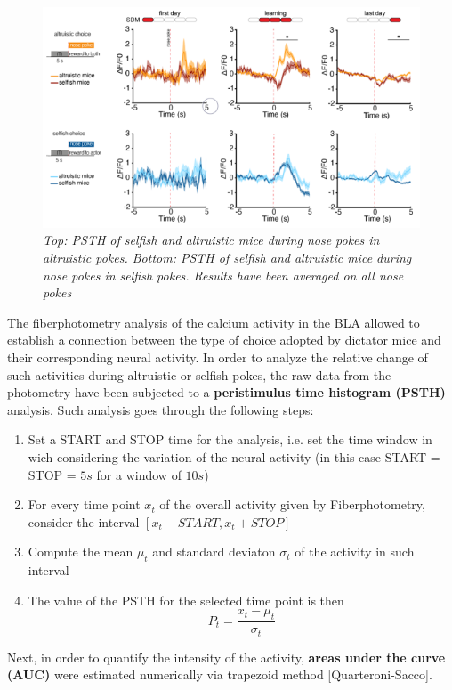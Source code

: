 \documentclass[a4paper]{article}
\begin{document}
\begin{figure}[H]
	\begin{center}
		\includegraphics[scale=0.77]{psth.png} 
	\end{center} 
	\caption{\textit{Top: PSTH of selfish and altruistic mice during nose pokes in altruistic pokes. Bottom:  PSTH of selfish and altruistic mice during nose pokes in selfish pokes. Results have been averaged on all nose pokes}}
	
\end{figure}

The fiberphotometry analysis of the calcium activity in the BLA allowed to establish a connection between the type of choice adopted by dictator mice and their corresponding neural activity. In order to analyze the relative change of such activities during altruistic or selfish pokes, the raw data from the photometry have been subjected to a \textbf{peristimulus time histogram (PSTH)} analysis. Such analysis goes through the following steps:

\begin{enumerate}
	
	\item Set a START and STOP time for the analysis, i.e. set the time window in wich considering the variation of the neural activity (in this case START = STOP = $5 s$ for a window of $10 s$)
	
	\item For every time point $x_t$ of the overall activity given by Fiberphotometry, consider the interval $[x_{t}-START , x_{t}+STOP]$
	
	\item Compute the mean $ \mu_t$ and standard deviaton $\sigma_t$ of the activity in such interval
	
	\item The value of the PSTH for the selected time point is then
	$$ P_t = \frac{x_t - \mu_t}{\sigma_t}$$
\end{enumerate}
Next, in order to quantify the intensity of the activity, \textbf{areas under the curve (AUC)} were estimated numerically via trapezoid method [Quarteroni-Sacco].\\
\end{document}
